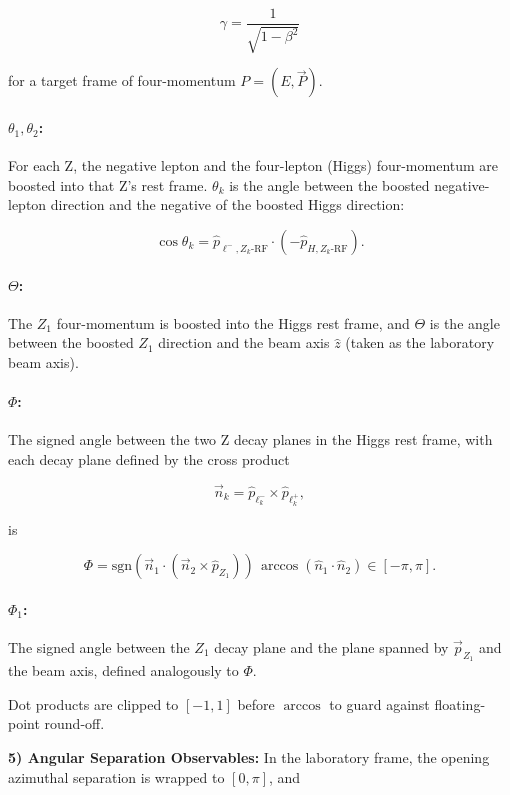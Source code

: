 \documentclass[conference]{IEEEtran}
\begin{document}
{\[
\gamma = \frac{1}{\sqrt{1-\beta^2}}
\]

for a target frame of four-momentum
$P = (E,\vec{P})$.

\paragraph{$\theta_1,\theta_2$:}

For each Z, the negative lepton and the four-lepton (Higgs) four-momentum are boosted into that Z's rest frame. $\theta_k$ is the angle between the boosted negative-lepton direction and the negative of the boosted Higgs direction:

\[
\cos\theta_k
=
\hat{p}_{\ell^-, Z_k\text{-RF}}
\cdot
\left(
-\hat{p}_{H, Z_k\text{-RF}}
\right).
\]

\paragraph{$\Theta$:}

The $Z_1$ four-momentum is boosted into the Higgs rest frame, and $\Theta$ is the angle between the boosted $Z_1$ direction and the beam axis $\hat{z}$ (taken as the laboratory beam axis).

\paragraph{$\Phi$:}

The signed angle between the two Z decay planes in the Higgs rest frame, with each decay plane defined by the cross product

\[
\vec{n}_k
=
\hat{p}_{\ell_k^-}
\times
\hat{p}_{\ell_k^+},
\]

is

\[
\Phi
=
\mathrm{sgn}
\left(
\vec{n}_1
\cdot
(\vec{n}_2 \times \hat{p}_{Z_1})
\right)
\,
\arccos
\left(
\hat{n}_1 \cdot \hat{n}_2
\right)
\in [-\pi,\pi].
\]

\paragraph{$\Phi_1$:}

The signed angle between the $Z_1$ decay plane and the plane spanned by $\vec{p}_{Z_1}$ and the beam axis, defined analogously to $\Phi$.

Dot products are clipped to $[-1,1]$ before $\arccos$ to guard against floating-point round-off.

\textbf{5) Angular Separation Observables:} In the laboratory frame, the opening azimuthal separation is wrapped to $[0,\pi]$, and

}
\end{document}
